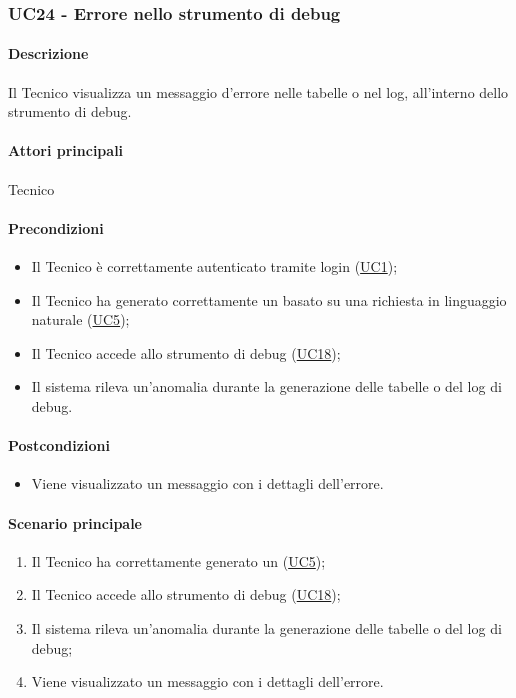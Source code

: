 \subsubsection{UC24 - Errore nello strumento di debug}\label{UC23}
\paragraph*{Descrizione}
Il Tecnico visualizza un messaggio d'errore nelle tabelle o nel log, all'interno dello strumento di debug. 

\paragraph*{Attori principali}
Tecnico

\paragraph*{Precondizioni}
\begin{itemize}
  \item Il Tecnico è correttamente autenticato tramite login (\hyperref[UC1]{UC1});
  \item Il Tecnico ha generato correttamente un  basato su una richiesta in linguaggio naturale (\hyperref[UC5]{UC5});
  \item Il Tecnico accede allo strumento di debug (\hyperref[UC18]{UC18});
  \item Il sistema rileva un'anomalia durante la generazione delle tabelle o del log di debug.
\end{itemize}

\paragraph*{Postcondizioni}
\begin{itemize}
  \item Viene visualizzato un messaggio con i dettagli dell'errore.
\end{itemize}

\paragraph*{Scenario principale}
\begin{enumerate}
  \item Il Tecnico ha correttamente generato un  (\hyperref[UC5]{UC5});
  \item Il Tecnico accede allo strumento di debug (\hyperref[UC18]{UC18});
  \item Il sistema rileva un'anomalia durante la generazione delle tabelle o del log di debug;
  \item Viene visualizzato un messaggio con i dettagli dell'errore.
\end{enumerate}
